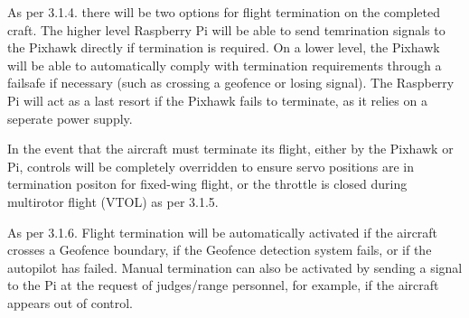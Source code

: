 As per 3.1.4. there will be two options for flight termination on the completed craft. The higher level Raspberry Pi will be able to send temrination signals to the Pixhawk directly if termination is required.  On a lower level, the Pixhawk will be able to automatically comply with termination requirements through a failsafe if necessary (such as crossing a geofence or losing signal). The Raspberry Pi will act as a last resort if the Pixhawk fails to terminate, as it relies on a seperate power supply. 

In the event that the aircraft must terminate its flight, either by the Pixhawk or Pi, controls will be completely overridden to ensure servo positions are in termination positon for fixed-wing flight, or the throttle is closed during multirotor flight (VTOL) as per 3.1.5.

As per 3.1.6. Flight termination will be automatically activated if the aircraft crosses a Geofence boundary, if the Geofence detection system fails, or if the autopilot has failed. Manual termination can also be activated by sending a signal to the Pi at the request of judges/range personnel, for example, if the aircraft appears out of control.